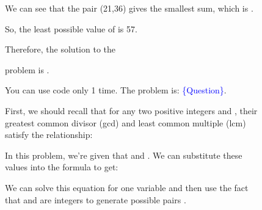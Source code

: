 \documentclass{article} \usepackage{iclr2023_conference,times}
\begin{document}
\begin{figure}[t]
\begin{minipage}{0.62\textwidth}
\begin{minipage}{0.42\textwidth}
\begin{tcolorbox}[colback=red!5!white,colframe=red!75!black,title=\large(a)~\normalsize Model output,
    left=1mm,  right=1mm, top=1mm,   bottom=1mm ]
\begin{tiny}
We can see that the pair (21,36) gives the smallest sum, which is .

So, the least possible value of  is 57.

Therefore, the solution to the 

problem is .\Large \textcolor{red}{\xmark}

\end{tiny}
\vspace{-0.5mm}
\end{tcolorbox}
\end{minipage}
\hfill
\begin{minipage}{0.57\textwidth}
\begin{tcolorbox}[colback=red!5!white,colframe=red!75!black,title=\large(b)~\normalsize Model output,
    left=1mm,  right=1mm, top=1mm,   bottom=1mm ]
\begin{tiny}
\begin{tcolorbox}[colback=blue!9!white,colframe=blue!75!black,title=Prompt 2,
    left=1mm,  right=1mm, top=1mm,   bottom=1mm ]
\vspace{0.2mm}
You can use code only 1 time. The problem is: \textcolor{blue}{\{Question\}}.
\vspace{0.2mm}
\end{tcolorbox}
First, we should recall that for any two positive integers  and , their greatest common divisor (gcd) and least common multiple (lcm) satisfy the relationship:
\vspace{-2mm}

\vspace{-3mm}

In this problem, we're given that  and . We can substitute these values into the formula to get:
\vspace{-2mm}

\vspace{-4mm}

We can solve this equation for one variable and then use the fact that  and  are integers to generate possible pairs .


\end{tiny}
\end{tcolorbox}
\end{minipage}
\end{minipage}
\end{figure}
\end{document}
